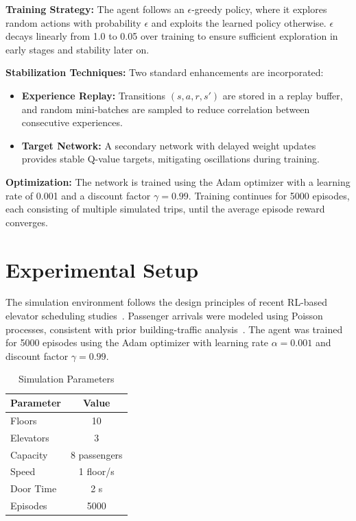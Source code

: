 \documentclass[conference]{IEEEtran}
\begin{document}
\textbf{Training Strategy:}  
The agent follows an $\epsilon$-greedy policy, where it explores random actions with probability $\epsilon$ and exploits the learned policy otherwise. $\epsilon$ decays linearly from 1.0 to 0.05 over training to ensure sufficient exploration in early stages and stability later on.  

\textbf{Stabilization Techniques:}  
Two standard enhancements are incorporated\cite{mnih2015human}:
\begin{itemize}
    \item \textbf{Experience Replay:} Transitions $(s, a, r, s')$ are stored in a replay buffer, and random mini-batches are sampled to reduce correlation between consecutive experiences.
    \item \textbf{Target Network:} A secondary network with delayed weight updates provides stable Q-value targets, mitigating oscillations during training.
\end{itemize}

\textbf{Optimization:}  
The network is trained using the Adam optimizer with a learning rate of 0.001 and a discount factor $\gamma = 0.99$. Training continues for 5000 episodes, each consisting of multiple simulated trips, until the average episode reward converges.


\section{Experimental Setup}
The simulation environment follows the design principles of recent RL-based elevator scheduling studies~\cite{luo2020deep, fan2019application}. 
Passenger arrivals were modeled using Poisson processes, consistent with prior building-traffic analysis~\cite{siikonen1997planning}.
The agent was trained for 5000 episodes using the Adam optimizer with learning rate $\alpha = 0.001$ and discount factor $\gamma = 0.99$.

\begin{table}[htbp]
\caption{Simulation Parameters}
\centering
\begin{tabular}{lc}
\toprule
Parameter & Value \\
\midrule
Floors & 10 \\
Elevators & 3 \\
Capacity & 8 passengers \\
Speed & 1 floor/s \\
Door Time & 2 s \\
Episodes & 5000 \\
\bottomrule
\end{tabular}
\end{table}
\end{document}
